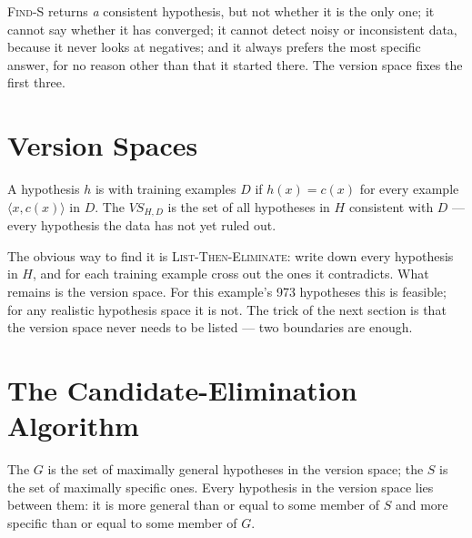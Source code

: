 \begin{alertbox}
\textsc{Find-S} returns \emph{a} consistent hypothesis, but not whether it is the
only one; it cannot say whether it has converged; it cannot detect noisy or
inconsistent data, because it never looks at negatives; and it always prefers the
most specific answer, for no reason other than that it started there. The version
space fixes the first three.
\end{alertbox}

\section{Version Spaces}

\begin{definitionbox}
A hypothesis $h$ is  with training examples $D$ if $h(x) = c(x)$
for every example $\langle x, c(x)\rangle$ in $D$. The 
$VS_{H,D}$ is the set of all hypotheses in $H$ consistent with $D$ --- every
hypothesis the data has not yet ruled out.
\end{definitionbox}

The obvious way to find it is \textsc{List-Then-Eliminate}: write down every
hypothesis in $H$, and for each training example cross out the ones it
contradicts. What remains is the version space. For this example's 973 hypotheses
this is feasible; for any realistic hypothesis space it is not. The trick of the
next section is that the version space never needs to be listed --- two
boundaries are enough.

\section{The Candidate-Elimination Algorithm}

\begin{definitionbox}
The  $G$ is the set of maximally general hypotheses in the
version space; the  $S$ is the set of maximally specific
ones. Every hypothesis in the version space lies between them: it is more general
than or equal to some member of $S$ and more specific than or equal to some member
of $G$.
\end{definitionbox}

